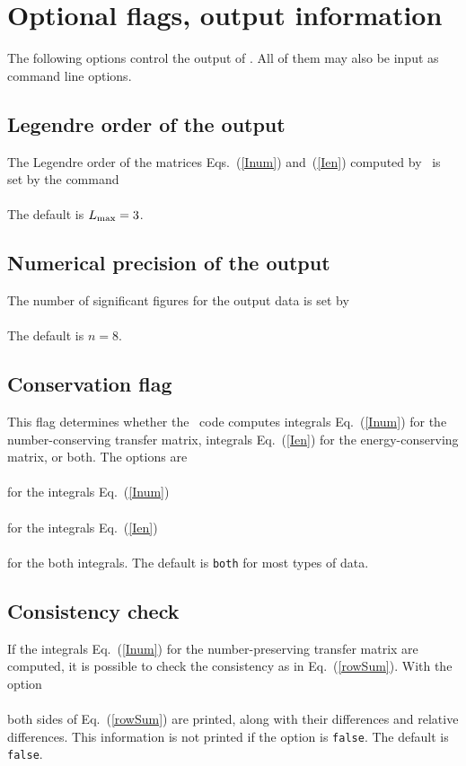 \section{Optional flags, output information}
\label{Sec:usage-optional}
The following options control the output of \gettransfer.
All of them may also be input as command line options.

\subsection{Legendre order of the output}\label{Sec:LegendreOrder}
The Legendre order of the matrices Eqs.~(\ref{Inum}) and~(\ref{Ien})
computed by \gettransfer\ is set by the command\\
  \\
The default is $L_{\text{max}} = 3$.

\subsection{Numerical precision of the output}
The number of significant figures for the output data is set by\\
  \\
The default is $n = 8$.

\subsection{Conservation flag}\label{Sec:conserveFlag}
This flag determines whether the \gettransfer\ code computes integrals
   Eq.~(\ref{Inum}) for the number-conserving transfer matrix,
   integrals  Eq.~(\ref{Ien}) for the energy-conserving matrix, or both.
   The options are\\
   \\
for the integrals Eq.~(\ref{Inum})\\
   \\
for the integrals Eq.~(\ref{Ien})\\
   \\
for the both integrals.  The default is \texttt{both} for most types of data.

\subsection{Consistency check}
If the integrals Eq.~(\ref{Inum}) for the number-preserving transfer matrix
are computed, it is possible to check the consistency as in Eq.~(\ref{rowSum}).
With the option\\
  \\
both sides of Eq.~(\ref{rowSum}) are printed, along with their differences
and relative differences.  This information is not printed if the option is \texttt{false}.
The default is \texttt{false}.

